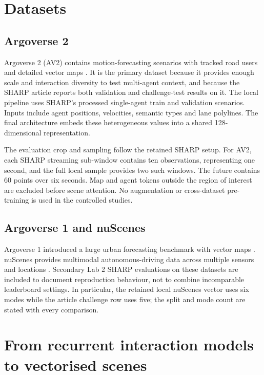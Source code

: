 \section{Datasets}

\subsection{Argoverse 2}

Argoverse 2 (AV2) contains motion-forecasting scenarios with tracked road users and detailed vector maps \cite{wilson2021av2}. It is the primary dataset because it provides enough scale and interaction diversity to test multi-agent context, and because the SHARP article reports both validation and challenge-test results on it. The local pipeline uses SHARP's processed single-agent train and validation scenarios. Inputs include agent positions, velocities, semantic types and lane polylines. The final architecture embeds these heterogeneous values into a shared 128-dimensional representation.

The evaluation crop and sampling follow the retained SHARP setup. For AV2, each SHARP streaming sub-window contains ten observations, representing one second, and the full local sample provides two such windows. The future contains 60 points over six seconds. Map and agent tokens outside the region of interest are excluded before scene attention. No augmentation or cross-dataset pre-training is used in the controlled studies.

\subsection{Argoverse 1 and nuScenes}

Argoverse 1 introduced a large urban forecasting benchmark with vector maps \cite{chang2019argoverse}. nuScenes provides multimodal autonomous-driving data across multiple sensors and locations \cite{caesar2020nuscenes}. Secondary Lab 2 SHARP evaluations on these datasets are included to document reproduction behaviour, not to combine incomparable leaderboard settings. In particular, the retained local nuScenes vector uses six modes while the article challenge row uses five; the split and mode count are stated with every comparison.

\section{From recurrent interaction models to vectorised scenes}

